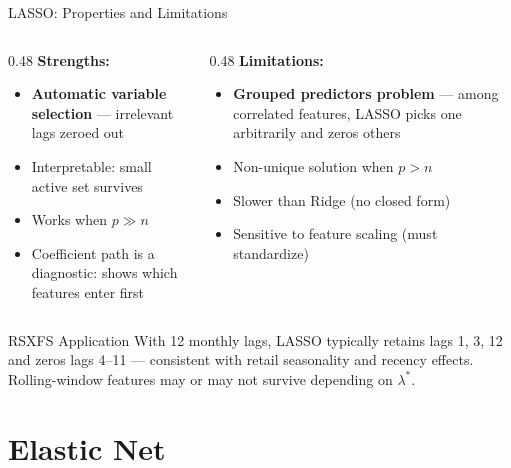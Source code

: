 \documentclass[aspectratio=169, 10pt]{beamer}
\begin{document}
\begin{frame}{LASSO: Properties and Limitations}
  \begin{columns}[T]
    \begin{column}{0.48\textwidth}
      \textbf{Strengths:}
      \begin{itemize}
        \item \textbf{Automatic variable selection} — irrelevant lags zeroed out
        \item Interpretable: small active set survives
        \item Works when $p \gg n$
        \item Coefficient path is a diagnostic: shows which features enter first
      \end{itemize}
    \end{column}
    \begin{column}{0.48\textwidth}
      \textbf{Limitations:}
      \begin{itemize}
        \item \textbf{Grouped predictors problem} — among correlated features,
              LASSO picks one arbitrarily and zeros others
        \item Non-unique solution when $p > n$
        \item Slower than Ridge (no closed form)
        \item Sensitive to feature scaling (must standardize)
      \end{itemize}
    \end{column}
  \end{columns}

  \medskip
  \begin{examplebox}{RSXFS Application}
    With 12 monthly lags, LASSO typically retains lags 1, 3, 12 and zeros
    lags 4–11 — consistent with retail seasonality and recency effects.
    Rolling-window features may or may not survive depending on $\lambda^*$.
  \end{examplebox}
\end{frame}

\section{Elastic Net}
\end{document}
